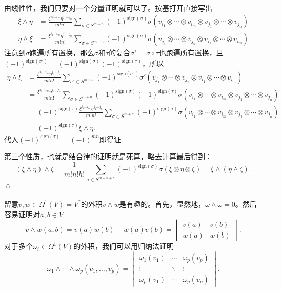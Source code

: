	由线性性，我们只要对一个分量证明就可以了。按基打开直接写出
	\[
		\begin{split}
			\xi \wedge \eta&=\frac{\xi^{i_1\dots i_m}\eta^{j_1 \dots j_n}}{m!n!}\sum_{\sigma\in S^{m+n}}(-1)^{\mathrm{sign}(\sigma)}\sigma(v_{i_1}\otimes \cdots \otimes v_{i_m}\otimes v_{j_1}\otimes \cdots \otimes v_{j_n})\\
			\eta \wedge \xi&=\frac{\xi^{i_1\dots i_m}\eta^{j_1 \dots j_n}}{m!n!}\sum_{\sigma\in S^{m+n}}(-1)^{\mathrm{sign}(\sigma)}\sigma(v_{j_1}\otimes \cdots \otimes v_{j_n}\otimes v_{i_1}\otimes \cdots \otimes v_{i_m})
		\end{split}
	\]
	注意到$\sigma$跑遍所有置换，那么$\sigma$和$\tau$的复合$\sigma'=\sigma\circ\tau$也跑遍所有置换，且$(-1)^{\mathrm{sign}(\sigma')}=(-1)^{\mathrm{sign}(\sigma)}(-1)^{\mathrm{sign}(\tau)}$，所以
	\[
		\begin{split}
			\eta \wedge \xi&=\frac{\xi^{i_1\cdots i_m}\eta^{j_1 \cdots j_n}}{m!n!}\sum_{\sigma'\in S^{m+n}}(-1)^{\mathrm{sign}(\sigma')}\sigma'(v_{j_1}\otimes \cdots \otimes v_{j_n}\otimes v_{i_1}\otimes \cdots \otimes v_{i_m})\\
			&=\frac{\xi^{i_1\cdots i_m}\eta^{j_1 \cdots j_n}}{m!n!}\sum_{\sigma\in S^{m+n}}(-1)^{\mathrm{sign}(\sigma)}(-1)^{\mathrm{sign}(\tau)}\sigma(v_{i_1}\otimes \cdots \otimes v_{i_m}\otimes v_{j_1}\otimes \cdots \otimes v_{j_n})\\
			&=(-1)^{\mathrm{sign}(\tau)}\frac{\xi^{i_1\cdots i_m}\eta^{j_1 \cdots j_n}}{m!n!}\sum_{\sigma\in S^{m+n}}(-1)^{\mathrm{sign}(\sigma)}\sigma(v_{i_1}\otimes \cdots \otimes v_{i_m}\otimes v_{j_1}\otimes \cdots \otimes v_{j_n})\\
			&=(-1)^{\mathrm{sign}(\tau)} \xi \wedge \eta.
		\end{split}
	\]
	代入$(-1)^{\mathrm{sign}(\tau)}=(-1)^{mn}$即得证.

	第三个性质，也就是结合律的证明就是死算，略去计算最后得到：
	\[
		(\xi \wedge \eta) \wedge \zeta=\frac{1}{m!n!h!}\sum_{\sigma\in S^{m+n+h}}(-1)^{\mathrm{sign}(\sigma)}\sigma(\xi \otimes \eta \otimes \zeta)=\xi \wedge (\eta \wedge \zeta).
	\]
	\qed

\para 留意$v,w\in \Omega^1(V)=V^*$的外积$v\wedge w$是有趣的。首先，显然地，$\omega\wedge\omega=0$。然后容易证明对$a,b\in V$
\[
	v\wedge w(a,b)=v(a)w(b)- w(a)v(b)=\begin{vmatrix}v(a)&v(b)\\w(a)&w(b)\end{vmatrix}.
\]
对于多个$\omega_i \in \Omega^1(V)$的外积，我们可以用归纳法证明
\[
	\omega_1\wedge \cdots \wedge\omega_p(v_1,\dots,v_p)=
	\begin{vmatrix}
		\omega_1(v_1)&\cdots&\omega_p(v_p)\\
		\vdots&\ddots&\vdots\\
		\omega_p(v_1)&\cdots&\omega_p(v_p)
	\end{vmatrix}.
\]

